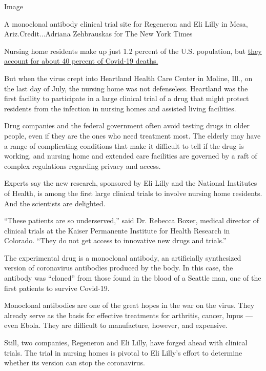 Image

A monoclonal antibody clinical trial site for Regeneron and Eli Lilly in
Mesa, Ariz.Credit...Adriana Zehbrauskas for The New York Times

Nursing home residents make up just 1.2 percent of the U.S. population,
but
\href{https://www.nytimes3xbfgragh.onion/interactive/2020/us/coronavirus-nursing-homes.html}{they
account for about 40 percent of Covid-19 deaths.}

But when the virus crept into Heartland Health Care Center in Moline,
Ill., on the last day of July, the nursing home was not defenseless.
Heartland was the first facility to participate in a large clinical
trial of a drug that might protect residents from the infection in
nursing homes and assisted living facilities.

Drug companies and the federal government often avoid testing drugs in
older people, even if they are the ones who need treatment most. The
elderly may have a range of complicating conditions that make it
difficult to tell if the drug is working, and nursing home and extended
care facilities are governed by a raft of complex regulations regarding
privacy and access.

Experts say the new research, sponsored by Eli Lilly and the National
Institutes of Health, is among the first large clinical trials to
involve nursing home residents. And the scientists are delighted.

``These patients are so underserved,'' said Dr. Rebecca Boxer, medical
director of clinical trials at the Kaiser Permanente Institute for
Health Research in Colorado. ``They do not get access to innovative new
drugs and trials.''

The experimental drug is a monoclonal antibody, an artificially
synthesized version of coronavirus antibodies produced by the body. In
this case, the antibody was ``cloned'' from those found in the blood of
a Seattle man, one of the first patients to survive Covid-19.

Monoclonal antibodies are one of the great hopes in the war on the
virus. They already serve as the basis for effective treatments for
arthritis, cancer, lupus --- even Ebola. They are difficult to
manufacture, however, and expensive.

Still, two companies, Regeneron and Eli Lilly, have forged ahead with
clinical trials. The trial in nursing homes is pivotal to Eli Lilly's
effort to determine whether its version can stop the coronavirus.

